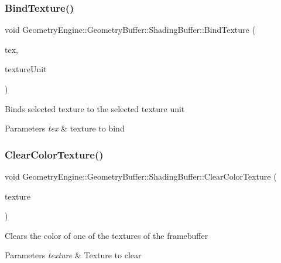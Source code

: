 \subsubsection{\texorpdfstring{BindTexture()}{BindTexture()}\hspace{0.1cm}{\footnotesize\ttfamily [2/2]}}
{\footnotesize\ttfamily void Geometry\+Engine\+::\+Geometry\+Buffer\+::\+Shading\+Buffer\+::\+Bind\+Texture (\begin{DoxyParamCaption}\item[{\mbox{\hyperlink{class_geometry_engine_1_1_geometry_buffer_1_1_shading_buffer_a8047a079ff9fb9fa3400651664c92ae9}{S\+H\+A\+D\+I\+N\+G\+B\+U\+F\+F\+E\+R\+\_\+\+T\+E\+X\+T\+U\+R\+E\+\_\+\+T\+Y\+PE}}}]{tex,  }\item[{unsigned int}]{texture\+Unit }\end{DoxyParamCaption})}

Binds selected texture to the selected texture unit 
\begin{DoxyParams}{Parameters}
{\em tex} & texture to bind \\
\hline
\end{DoxyParams}
\mbox{\label{class_geometry_engine_1_1_geometry_buffer_1_1_shading_buffer_aea07ae2845342993bc8949f7e52a4c90}} 
\subsubsection{\texorpdfstring{ClearColorTexture()}{ClearColorTexture()}}
{\footnotesize\ttfamily void Geometry\+Engine\+::\+Geometry\+Buffer\+::\+Shading\+Buffer\+::\+Clear\+Color\+Texture (\begin{DoxyParamCaption}\item[{\mbox{\hyperlink{class_geometry_engine_1_1_geometry_buffer_1_1_shading_buffer_a8047a079ff9fb9fa3400651664c92ae9}{S\+H\+A\+D\+I\+N\+G\+B\+U\+F\+F\+E\+R\+\_\+\+T\+E\+X\+T\+U\+R\+E\+\_\+\+T\+Y\+PE}}}]{texture }\end{DoxyParamCaption})}

Clears the color of one of the textures of the framebuffer 
\begin{DoxyParams}{Parameters}
{\em texture} & Texture to clear \\
\hline
\end{DoxyParams}
\mbox{\label{class_geometry_engine_1_1_geometry_buffer_1_1_shading_buffer_a608f7a6fbde69056a268fac83caecfab}} 
